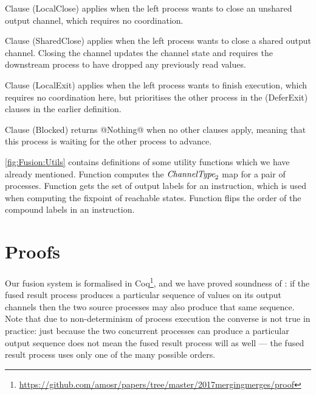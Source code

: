 Clause (LocalClose) applies when the left process wants to close an unshared output channel, which requires no coordination.

Clause (SharedClose) applies when the left process wants to close a shared output channel.
Closing the channel updates the channel state and requires the downstream process to have dropped any previously read values.

Clause (LocalExit) applies when the left process wants to finish execution, which requires no coordination here, but prioritises the other process in the (DeferExit) clauses in the earlier  definition.

Clause (Blocked) returns @Nothing@ when no other clauses apply, meaning that this process is waiting for the other process to advance.


\smallskip



\autoref{fig:Fusion:Utils} contains definitions of some utility functions which we have already mentioned.
Function  computes the $\textit{ChannelType}_2$ map for a pair of processes.
Function  gets the set of output labels for an instruction, which is used when computing the fixpoint of reachable states.
Function  flips the order of the compound labels in an instruction.



% 






\section{Proofs}
\label{s:Proofs}

Our fusion system is formalised in Coq\footnote{\url{https://github.com/amosr/papers/tree/master/2017mergingmerges/proof}}, and we have proved soundness of : if the fused result process produces a particular sequence of values on its output channels then the two source processes may also produce that same sequence. Note that due to non-determinism of process execution the converse is not true in practice: just because the two concurrent processes can produce a particular output sequence does not mean the fused result process will as well --- the fused result process uses only one of the many possible orders.

